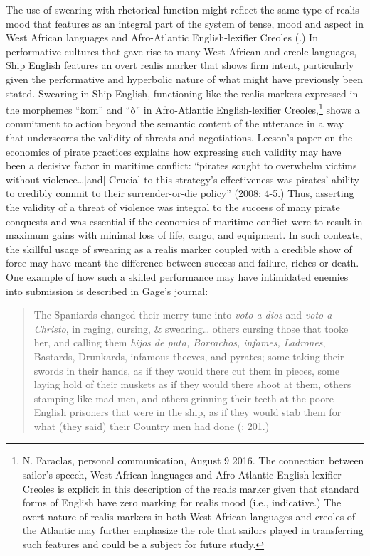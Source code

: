 The use of swearing with rhetorical function might reflect the same type of realis mood that features as an integral part of the system of tense, mood and aspect in West African languages and Afro-Atlantic English-lexifier Creoles (\citealt{FaraclasEtAl2016}.) In performative cultures that gave rise to many West African and creole languages, Ship English features an overt realis marker that shows firm intent, particularly given the performative and hyperbolic nature of what might have previously been stated. Swearing in Ship English, functioning like the realis markers expressed in the morphemes “kom” and “ò” in Afro-Atlantic English-lexifier Creoles,\footnote{N. Faraclas, personal communication, August 9 2016. The connection between sailor’s speech, West African languages and Afro-Atlantic English-lexifier Creoles is explicit in this description of the realis marker given that standard forms of English have zero marking for realis mood (i.e., indicative.) The overt nature of realis markers in both West African languages and creoles of the Atlantic may further emphasize the role that sailors played in transferring such features and could be a subject for future study.} shows a commitment to action beyond the semantic content of the utterance in a way that underscores the validity of threats and negotiations. Leeson’s paper on the economics of pirate practices explains how expressing such validity may have been a decisive factor in maritime conflict: “pirates sought to overwhelm victims without violence…[and] Crucial to this strategy’s effectiveness was pirates’ ability to credibly commit to their surrender-or-die policy” (2008: 4-5.) Thus, asserting the validity of a threat of violence was integral to the success of many pirate conquests and was essential if the economics of maritime conflict were to result in maximum gains with minimal loss of life, cargo, and equipment. In such contexts, the skillful usage of swearing as a realis marker coupled with a credible show of force may have meant the difference between success and failure, riches or death. One example of how such a skilled performance may have intimidated enemies into submission is described in Gage’s journal:

\begin{quotation}
The Spaniards changed their merry tune into \textit{voto a dios} and \textit{voto a Christo}, in raging, cursing, \& swearing… others cursing those that tooke her, and calling them \textit{hijos de puta, Borrachos, infames, Ladrones}, Bastards, Drunkards, infamous theeves, and pyrates; some taking their swords in their hands, as if they would there cut them in pieces, some laying hold of their muskets as if they would there shoot at them, others stamping like mad men, and others grinning their teeth at the poore English prisoners that were in the ship, as if they would stab them for what (they said) their Country men had done (\citealt{Gage1648}: 201.)\end{quotation}

